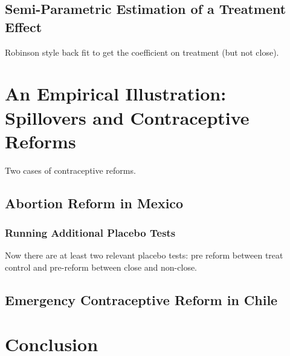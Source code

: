 \documentclass{article}
\begin{document}
\begin{spacing}{1.1}
\subsection{Semi-Parametric Estimation of a Treatment Effect}
Robinson style back fit to get the coefficient on treatment (but not close).
\citet{Imbens2004}

\section{An Empirical Illustration: Spillovers and Contraceptive Reforms}
Two cases of contraceptive reforms.
\subsection{Abortion Reform in Mexico}
\citet{ClarkeMuhlrad2014}



\subsubsection{Running Additional Placebo Tests}
Now there are at least two relevant placebo tests: pre reform between treat control
and pre-reform between close and non-close.

\subsection{Emergency Contraceptive Reform in Chile}
\citet{Clarke2014}


\section{Conclusion}



\end{spacing}
\end{document}
